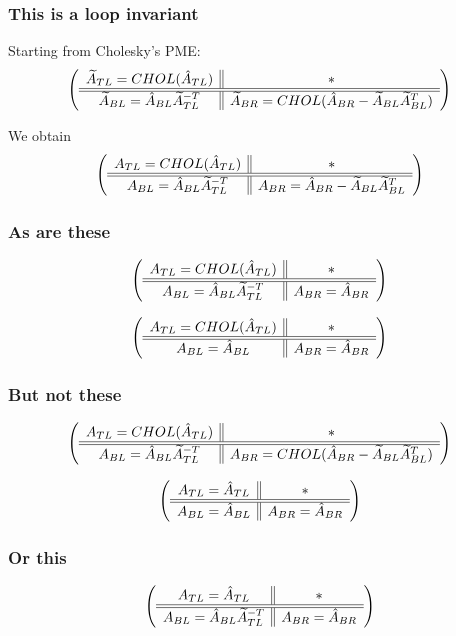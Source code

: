 \documentclass{beamer}
\begin{document}
\begin{frame}
  \frametitle{This is a loop invariant}
  Starting from Cholesky's PME:
  \begin{equation*}
    \left( \begin{array}{c || c} \widetilde{A}_{TL} = CHOL(\hat{A}_{TL}) & * \\ \hline \hline \widetilde{A}_{BL} = \hat{A}_{BL}\widetilde{A}_{TL}^{-T} & \widetilde{A}_{BR} = CHOL(\hat{A}_{BR} - \widetilde{A}_{BL}\widetilde{A}_{BL}^T) \end{array} \right)
  \end{equation*}

  We obtain
  \begin{equation*}
    \left( \begin{array}{c || c} A_{TL} = CHOL(\hat{A}_{TL}) & * \\ \hline \hline A_{BL} = \hat{A}_{BL}\widetilde{A}_{TL}^{-T} & A_{BR} = \hat{A}_{BR} - \widetilde{A}_{BL}\widetilde{A}_{BL}^T \end{array} \right)
  \end{equation*}
\end{frame}

\begin{frame}
  \frametitle{As are these}
  \begin{equation*}
    \left( \begin{array}{c || c} A_{TL} = CHOL(\hat{A}_{TL}) & * \\ \hline \hline A_{BL} = \hat{A}_{BL}\widetilde{A}_{TL}^{-T} & A_{BR} = \hat{A}_{BR} \end{array} \right)
  \end{equation*}

  \begin{equation*}
    \left( \begin{array}{c || c} A_{TL} = CHOL(\hat{A}_{TL}) & * \\ \hline \hline A_{BL} = \hat{A}_{BL} & A_{BR} = \hat{A}_{BR} \end{array} \right)
  \end{equation*}
\end{frame}

\begin{frame}
  \frametitle{But not these}
  \begin{equation*}
    \left( \begin{array}{c || c} A_{TL} = CHOL(\hat{A}_{TL}) & * \\ \hline \hline A_{BL} = \hat{A}_{BL}\widetilde{A}_{TL}^{-T} & A_{BR} = CHOL(\hat{A}_{BR} - \widetilde{A}_{BL}\widetilde{A}_{BL}^T) \end{array} \right)
  \end{equation*}

  \begin{equation*}
    \left( \begin{array}{c || c} A_{TL} = \hat{A}_{TL} & * \\ \hline \hline A_{BL} = \hat{A}_{BL} & A_{BR} = \hat{A}_{BR} \end{array} \right)
  \end{equation*}
\end{frame}

\begin{frame}
  \frametitle{Or this}
  \begin{equation*}
    \left( \begin{array}{c || c} A_{TL} = \hat{A}_{TL} & * \\ \hline \hline A_{BL} = \hat{A}_{BL}\widetilde{A}_{TL}^{-T} & A_{BR} = \hat{A}_{BR} \end{array} \right)
  \end{equation*}
\end{frame}
\end{document}
